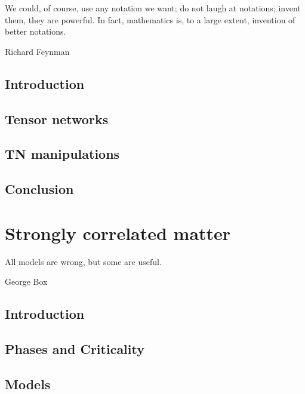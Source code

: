 \documentclass{book}
\newcounter{a}
\newcounter{b}
\begin{document}
\epigraph{We could, of course, use any notation we want; do not laugh at notations; invent them, they are powerful. In fact, mathematics is, to a large extent, invention of better notations.}{Richard Feynman}

\section{Introduction}


\section{Tensor networks}


\section{\Gls{TN} manipulations}\label{sec:mpomath}




\section{Conclusion}


\chapter{Strongly correlated matter}\label{chap3}

\epigraph{All models are wrong, but some are useful.}{George Box}

\section{Introduction}


\section{Phases and Criticality} \label{sec:PhasesAndCrit}


\section{Models}

\end{document}
